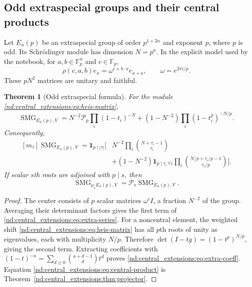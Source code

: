 \documentclass[10pt]{article}
\newcommand{\SMG}{\operatorname{SMG}}
\newcommand{\MGF}{\SMG}
\newcommand{\F}{\mathbb F}
\newcommand{\PP}{\mathcal P}
\newtheorem{theorem}{Theorem}
\begin{document}
\subsection{Odd extraspecial groups and their central products}

Let $E_n(p)$ be an extraspecial group of order $p^{1+2n}$ and exponent $p$,
where $p$ is odd.  Its Schr\"odinger module has dimension $N=p^n$.  In the
explicit model used by the notebook, for $a,b\in\F_p^n$ and $c\in\F_p$,
\begin{equation}\label{nd:central_extensions:eq:heis-matrix}
 \rho(c,a,b)e_x=\omega^{c+b\cdot x}e_{x+a},
 \qquad \omega=e^{2\pi i/p}.
\end{equation}
These $pN^2$ matrices are unitary and faithful.

\begin{theorem}[Odd extraspecial formula]\label{nd:central_extensions:thm:extra-odd}
For the module \eqref{nd:central_extensions:eq:heis-matrix},
\begin{equation}\label{nd:central_extensions:eq:extra-series}
 \boxed{\MGF_{E_n(p),V}
 =N^{-2}\PP_p\prod_i(1-t_i)^{-N}
 +(1-N^{-2})\prod_i(1-t_i^p)^{-N/p}.}
\end{equation}
Consequently,
\begin{align}\label{nd:central_extensions:eq:extra-coeff}
 [m_\tau]\MGF_{E_n(p),V}
 =\mathbf1_{p\mid|\tau|}\biggl[&N^{-2}
 \prod_i\binom{N+\tau_i-1}{\tau_i}\\
 &+(1-N^{-2})\mathbf1_{p\mid\tau_i\ \forall i}
 \prod_i\binom{N/p+\tau_i/p-1}{\tau_i/p}\biggr].\nonumber
\end{align}
If scalar $s$th roots are adjoined with $p\mid s$, then
\begin{equation}\label{nd:central_extensions:eq:central-product}
 \MGF_{\mu_sE_n(p),V}=\PP_s\MGF_{E_n(p),V}.
\end{equation}
\end{theorem}

\begin{proof}
The center consists of $p$ scalar matrices $\omega^cI$, a fraction $N^{-2}$
of the group.  Averaging their determinant factors gives the first term of
\eqref{nd:central_extensions:eq:extra-series}.  For a noncentral element, the weighted shift
\eqref{nd:central_extensions:eq:heis-matrix} has all $p$th roots of unity as eigenvalues, each with
multiplicity $N/p$.  Therefore
$\det(I-tg)=(1-t^p)^{N/p}$, giving the second term.  Extracting coefficients
with $(1-t)^{-a}=\sum_{d\geq0}\binom{a+d-1}{d}t^d$ proves
\eqref{nd:central_extensions:eq:extra-coeff}.  Equation \eqref{nd:central_extensions:eq:central-product} is
Theorem~\ref{nd:central_extensions:thm:projector}.
\end{proof}
\end{document}
